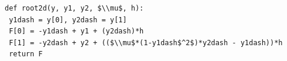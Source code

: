 \documentclass[border=10pt]{standalone}
\begin{document}
\begin{lstlisting}
def root2d(y, y1, y2, $\\mu$, h):
 y1dash = y[0], y2dash = y[1]
 F[0] = -y1dash + y1 + (y2dash)*h
 F[1] = -y2dash + y2 + (($\\mu$*(1-y1dash$^2$)*y2dash - y1dash))*h
 return F
\end{lstlisting}
\end{document}

